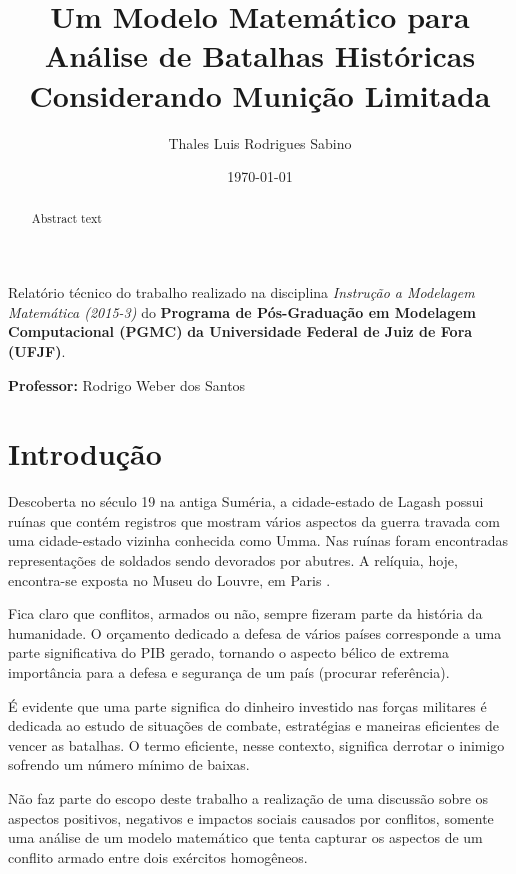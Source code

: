 \documentclass{article}
\title{Um Modelo Matemático para Análise de Batalhas Históricas Considerando Munição Limitada} %
\author{Thales Luis Rodrigues Sabino} %
\date{\today} %
\begin{document}
\maketitle %

\begin{center}
Relatório técnico do trabalho realizado na disciplina \textit{Instrução a Modelagem Matemática (2015-3)} do \textbf{Programa de Pós-Graduação em Modelagem Computacional (PGMC)} \textbf{da Universidade Federal de Juiz de Fora (UFJF)}.
\end{center}


\begin{center}
\textbf{Professor:} Rodrigo Weber dos Santos
\end{center}

\begin{abstract}
Abstract text
\end{abstract}


\section{Introdução}

Descoberta no século 19 na antiga Suméria, a cidade-estado de Lagash possui ruínas que contém registros que mostram vários aspectos da guerra travada com uma cidade-estado vizinha conhecida como Umma. Nas ruínas foram encontradas representações de soldados sendo devorados por abutres. A relíquia, hoje, encontra-se exposta no Museu do Louvre, em Paris \cite{firstwar}.

Fica claro que conflitos, armados ou não, sempre fizeram parte da história da humanidade. O orçamento dedicado a defesa de vários países corresponde a uma parte significativa do PIB gerado, tornando o aspecto bélico de extrema importância para a defesa e segurança de um país (procurar referência).

É evidente que uma parte significa do dinheiro investido nas forças militares é dedicada ao estudo de situações de combate, estratégias e maneiras eficientes de vencer as batalhas. O termo eficiente, nesse contexto, significa derrotar o inimigo sofrendo um número mínimo de baixas. 

Não faz parte do escopo deste trabalho a realização de uma discussão sobre os aspectos positivos, negativos e impactos sociais causados por conflitos, somente uma análise de um modelo  matemático que tenta capturar os aspectos de um conflito armado entre dois exércitos homogêneos.
\end{document}
